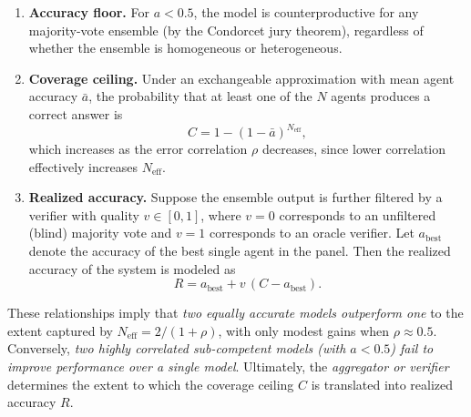 \documentclass[manuscript,screen,review]{acmart}
\begin{document}
\begin{enumerate}
\item \textbf{Accuracy floor.} For $a < 0.5$, the model is counterproductive for any majority-vote ensemble (by the Condorcet jury theorem), regardless of whether the ensemble is homogeneous or heterogeneous.

\item \textbf{Coverage ceiling.} Under an exchangeable approximation with mean agent accuracy $\bar a$, the probability that at least one of the $N$ agents produces a correct answer is
\begin{equation}
C = 1 - (1 - \bar a)^{N_{\mathrm{eff}}},
\end{equation}
which increases as the error correlation $\rho$ decreases, since lower correlation effectively increases $N_{\mathrm{eff}}$.

\item \textbf{Realized accuracy.} Suppose the ensemble output is further filtered by a verifier with quality $v \in [0,1]$, where $v=0$ corresponds to an unfiltered (blind) majority vote and $v=1$ corresponds to an oracle verifier. Let $a_{\mathrm{best}}$ denote the accuracy of the best single agent in the panel. Then the realized accuracy of the system is modeled as
\begin{equation}
R = a_{\mathrm{best}} + v\,(C - a_{\mathrm{best}}).
\end{equation}
\end{enumerate}

These relationships imply that \emph{two equally accurate models outperform one} to the extent captured by $N_{\mathrm{eff}} = 2/(1+\rho)$, with only modest gains when $\rho \approx 0.5$. Conversely, \emph{two highly correlated sub-competent models (with $a<0.5$) fail to improve performance over a single model}. Ultimately, the \emph{aggregator or verifier} determines the extent to which the coverage ceiling $C$ is translated into realized accuracy $R$.
\end{document}
